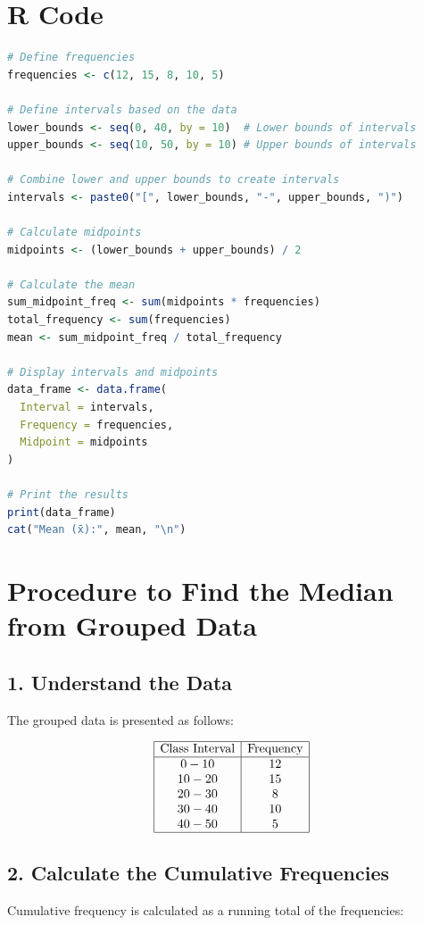 \documentclass[10pt]{book}
\begin{document}
\section*{R Code}
\begin{lstlisting}[language=R, caption={R Code for Calculating Weighted Mean}, label={lst:weighted_mean}]
# Define frequencies
frequencies <- c(12, 15, 8, 10, 5)

# Define intervals based on the data
lower_bounds <- seq(0, 40, by = 10)  # Lower bounds of intervals
upper_bounds <- seq(10, 50, by = 10) # Upper bounds of intervals

# Combine lower and upper bounds to create intervals
intervals <- paste0("[", lower_bounds, "-", upper_bounds, ")")

# Calculate midpoints
midpoints <- (lower_bounds + upper_bounds) / 2

# Calculate the mean
sum_midpoint_freq <- sum(midpoints * frequencies)
total_frequency <- sum(frequencies)
mean <- sum_midpoint_freq / total_frequency

# Display intervals and midpoints
data_frame <- data.frame(
  Interval = intervals,
  Frequency = frequencies,
  Midpoint = midpoints
)

# Print the results
print(data_frame)
cat("Mean (x̄):", mean, "\n")
\end{lstlisting}



\section{Procedure to Find the Median from Grouped Data}

\subsection*{1. Understand the Data}
The grouped data is presented as follows:

\[
\begin{array}{|c|c|}
\hline
\text{Class Interval} & \text{Frequency} \\
\hline
0-10 & 12 \\
10-20 & 15 \\
20-30 & 8 \\
30-40 & 10 \\
40-50 & 5 \\
\hline
\end{array}
\]

\subsection*{2. Calculate the Cumulative Frequencies}
Cumulative frequency is calculated as a running total of the frequencies:
\end{document}
